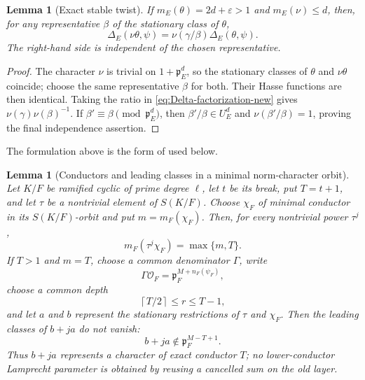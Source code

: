 \documentclass[11pt]{amsart}
\newtheorem{lemma}[theorem]{Lemma}
\theoremstyle{definition}
\theoremstyle{remark}
\newcommand{\cO}{\mathcal O}
\newcommand{\p}{\mathfrak p}
\newcommand{\ceil}[1]{\left\lceil #1\right\rceil}
\begin{document}
\begin{lemma}[Exact stable twist]\label{lem:stable-twist-new}
If $m_E(\theta)=2d+\varepsilon>1$ and
$m_E(\nu)\leq d$, then, for any representative $\beta$ of the
stationary class of $\theta$,
\begin{equation}\label{eq:stable-twist-new}
 \Delta_E(\nu\theta,\psi)=
 \nu(\gamma/\beta)\Delta_E(\theta,\psi).
\end{equation}
The right-hand side is independent of the chosen representative.
\end{lemma}

\begin{proof}
The character $\nu$ is trivial on $1+\p_E^d$, so the stationary
classes of $\theta$ and $\nu\theta$ coincide; choose the same
representative $\beta$ for both.  Their Hasse functions are then
identical.  Taking the ratio in
\eqref{eq:Delta-factorization-new} gives
$\nu(\gamma)\nu(\beta)^{-1}$.  If
$\beta'\equiv\beta\pmod{\p_E^d}$, then
$\beta'/\beta\in U_E^d$ and $\nu(\beta'/\beta)=1$, proving the final
independence assertion.
\end{proof}

The formulation above is the form of \cite[Lemma 9.4, pp.~87--88]{Langlands} used below.

\begin{lemma}[Conductors and leading classes in a minimal norm-character orbit]
\label{lem:minimal-orbit-stationary}
Let $K/F$ be ramified cyclic of prime degree $\ell$, let $t$ be its
break, put $T=t+1$, and let $\tau$ be a nontrivial element of
$S(K/F)$.  Choose $\chi_F$ of minimal conductor in its
$S(K/F)$-orbit and put $m=m_F(\chi_F)$.  Then, for every nontrivial
power $\tau^j$,
\begin{equation}\label{eq:minimal-orbit-conductors}
 m_F(\tau^j\chi_F)=\max\{m,T\}.
\end{equation}
If $T>1$ and $m=T$, choose a common denominator $\Gamma$, write
\[
 \Gamma\cO_F=\p_F^{M+n_F(\psi_F)},
\]
choose a common depth
\[
 \ceil{T/2}\le r\le T-1,
\]
and let $a$ and $b$ represent the stationary restrictions of $\tau$
and $\chi_F$.  Then the leading
classes of $b+ja$ do not vanish:
\begin{equation}\label{eq:minimal-orbit-no-leading-cancellation}
 b+ja\notin\p_F^{M-T+1}.
\end{equation}
Thus $b+ja$ represents a character of exact conductor $T$; no
lower-conductor Lamprecht parameter is obtained by reusing a cancelled
sum on the old layer.
\end{lemma}
\end{document}
